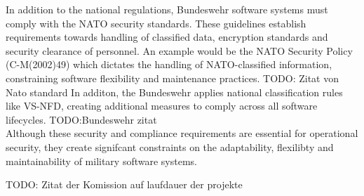 In addition to the national regulations, Bundeswehr software systems must comply with the NATO security standards. These guidelines establish requirements towards handling of classified data, encryption standards and security clearance of personnel.
An example would be the NATO Security Policy (C-M(2002)49) which dictates the handling of NATO-classified information, constraining software flexibility and maintenance practices. TODO: Zitat von Nato standard
In additon, the Bundeswehr applies national classification rules like \ac{VS-NFD}, creating additional measures to comply across all software lifecycles. TODO:Bundeswehr zitat\\

Although these security and compliance requirements are essential for operational security, they create signifcant constraints on the adaptability, flexilibty and maintainability of military software systems.


TODO: Zitat der Komission auf laufdauer der projekte 